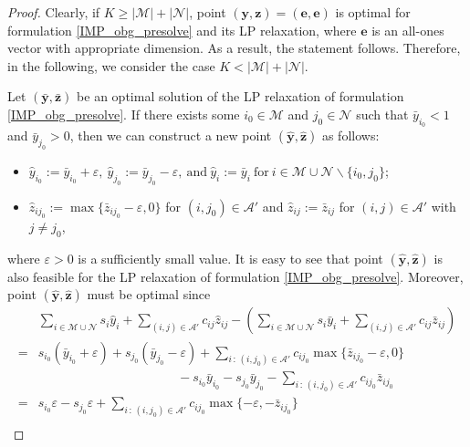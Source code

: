 \documentclass[a4paper,10pt]{article}
\theoremstyle{plain}
\begin{document}
	\begin{proof}
		Clearly, if $K \geq |\mathcal{M}|+|\mathcal{N}|$, point $(\boldsymbol{y},\boldsymbol{z})= (\boldsymbol{e},\boldsymbol{e})$ is optimal for formulation \eqref{IMP_obg_presolve} and its LP relaxation, where $\boldsymbol{e}$ is an all-ones vector with appropriate dimension. 
		As a result, the statement follows.
		Therefore, in the following, we consider the case $K < |\mathcal{M}|+|\mathcal{N}|$.
		
		Let $(\bar{\boldsymbol{y}}, \bar{\boldsymbol{z}})$ be an optimal solution of the LP relaxation of formulation \eqref{IMP_obg_presolve}.
		If there exists some $ i_0 \in \mathcal{M}$ and $j_0 \in \mathcal{N}$ such that $\bar{y}_{i_0}< 1$ and $\bar{y}_{j_0} > 0$, then we can construct a new point $(\hat{\boldsymbol{y}}, \hat{\boldsymbol{z}})$ as follows: 
		\begin{itemize}
			\item []
			$\hat{y}_{i_0} := \bar{y}_{i_0} + \varepsilon , ~ 	
			\hat{y}_{j_0} := \bar{y}_{j_0} - \varepsilon, ~\text{and}~ 
			\hat{y}_i := \bar{y}_i~\text{for}~i \in \mathcal{M}\cup \mathcal{N}\backslash\{i_0, j_0\}$;
			\item []
			$\hat{z}_{ij_0} := \max \{\bar{z}_{ij_0} - \varepsilon, 0\}$ for $(i,j_0) \in \mathcal{A}'$ and $\hat{z}_{ij} :=\bar{z}_{ij}$ for $(i,j)\in \mathcal{A}'$ with $j \neq j_0$,
		\end{itemize}
		where $\varepsilon > 0$ is a sufficiently small value.  
		It is easy to see that point $(\hat{\boldsymbol{y}}, \hat{\boldsymbol{z}})$ is also feasible for the LP relaxation of formulation \eqref{IMP_obg_presolve}.
		Moreover, point $(\hat{\boldsymbol{y}}, \hat{\boldsymbol{z}})$ must be optimal since
		\begin{equation*}
			\begin{aligned}
				&  \sum_{i\in\mathcal{M}\cup\mathcal{N}}s_i\hat{y}_i+\sum_{(i,j)\in\mathcal{A}'}c_{ij}\hat{z}_{ij} - 
				\left (\sum_{i\in\mathcal{M}\cup\mathcal{N}}s_i\bar{y}_i+\sum_{(i,j)\in\mathcal{A}'}c_{ij}\bar{z}_{ij}\right )\\
				=&   s_{i_0}(\bar{y}_{i_0}+\varepsilon) +s_{j_0} (\bar{y}_{j_0}-\varepsilon) +  \sum_{i\,:\,(i,j_0)\in \mathcal{A}'}c_{ij_0}\max\{ \bar{z}_{ij_0}-\varepsilon , 0\} \\ 
				&\qquad \qquad \qquad\qquad\qquad~~~~ -s_{i_0}\bar{y}_{i_0}  - s_{j_0} \bar{y}_{j_0}- \sum_{i\,:\,(i,j_0)\in \mathcal{A}'} c_{ij_0} \bar{z}_{ij_0}\\
				=&  s_{i_0}\varepsilon  - s_{j_0} \varepsilon + \sum_{i\,:\,(i,j_0)\in \mathcal{A}'}c_{ij_0}\max\{ -\varepsilon , - \bar{z}_{ij_0}\}  \\

\end{aligned}
\end{equation*}
\end{proof}
\end{document}
